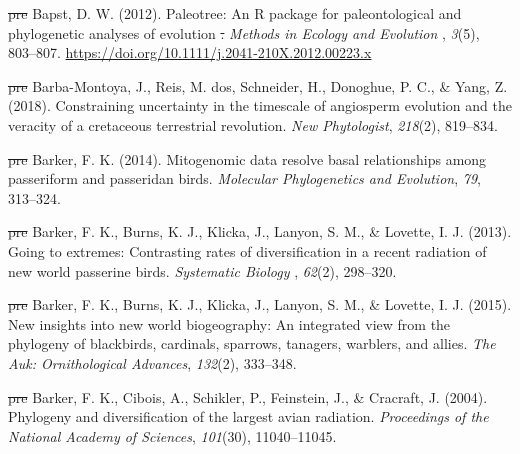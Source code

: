 \documentclass[english,man]{apa6} %
\providecommand{\DIFaddtex}[1]{{\protect\color{blue}\uwave{#1}}} %
\providecommand{\DIFdeltex}[1]{{\protect\color{red}\sout{#1}}}                      %
\providecommand{\DIFaddbegin}{} %
\providecommand{\DIFaddend}{} %
\providecommand{\DIFdelbegin}{} %
\providecommand{\DIFdelend}{} %
\providecommand{\DIFadd}[1]{\texorpdfstring{\DIFaddtex{#1}}{#1}} %
\providecommand{\DIFdel}[1]{\texorpdfstring{\DIFdeltex{#1}}{}} %
\newcommand{\DIFscaledelfig}{0.5}
\newlength{\DIFdelgraphicswidth} %
\newlength{\DIFdelgraphicsheight} %
\newcommand{\DIFaddincludegraphics}[2][]{{\color{blue}\fbox{\DIFOincludegraphics[#1]{#2}}}} %
\newcommand{\DIFdelincludegraphics}[2][]{%
\sbox{\DIFdelgraphicsbox}{\DIFOincludegraphics[#1]{#2}}%
\settoboxwidth{\DIFdelgraphicswidth}{\DIFdelgraphicsbox} %
\settoboxtotalheight{\DIFdelgraphicsheight}{\DIFdelgraphicsbox} %
\scalebox{\DIFscaledelfig}{%
\parbox[b]{\DIFdelgraphicswidth}{\usebox{\DIFdelgraphicsbox}\\[-\baselineskip] \rule{\DIFdelgraphicswidth}{0em}}\llap{\resizebox{\DIFdelgraphicswidth}{\DIFdelgraphicsheight}{%
\setlength{\unitlength}{\DIFdelgraphicswidth}%
\begin{picture}(1,1)%
\thicklines\linethickness{2pt} %
{\color[rgb]{1,0,0}\put(0,0){\framebox(1,1){}}}%
{\color[rgb]{1,0,0}\put(0,0){\line( 1,1){1}}}%
{\color[rgb]{1,0,0}\put(0,1){\line(1,-1){1}}}%
\end{picture}%
}\hspace*{3pt}}} %
} %
\DeclareRobustCommand{\DIFaddbegin}{\DIFOaddbegin \let\includegraphics\DIFaddincludegraphics} %
\DeclareRobustCommand{\DIFaddend}{\DIFOaddend \let\includegraphics\DIFOincludegraphics} %
\DeclareRobustCommand{\DIFdelbegin}{\DIFOdelbegin \let\includegraphics\DIFdelincludegraphics} %
\DeclareRobustCommand{\DIFdelend}{\DIFOaddend \let\includegraphics\DIFOincludegraphics} %
\begin{document}
\leavevmode\DIFdelbegin %
\DIFdel{pre}%
\DIFdelend \hypertarget{ref-Bapst2012a}{}\DIFdelbegin %
\DIFdelend %
Bapst, D. W. (2012). \DIFdelbegin %
\DIFdelend Paleotree: An R package for paleontological and phylogenetic analyses of evolution\DIFdelbegin %
\DIFdel{. }\DIFdelend \DIFaddbegin \DIFadd{. }\DIFaddend \emph{\DIFdelbegin %
\DIFdelend Methods in Ecology and Evolution\DIFdelbegin %
\DIFdelend }, \emph{3}(5), 803--807. \url{https://doi.org/10.1111/j.2041-210X.2012.00223.x}

\leavevmode\DIFdelbegin %
\DIFdel{pre}%
\DIFdelend \hypertarget{ref-barba2018constraining}{}\DIFdelbegin %
\DIFdelend %
Barba-Montoya, J., Reis, M. dos, Schneider, H., Donoghue, P. C., \& Yang, Z. (2018). Constraining uncertainty in the timescale of angiosperm evolution and the veracity of a cretaceous terrestrial revolution. \emph{New Phytologist}, \emph{218}(2), 819--834.

\leavevmode\DIFdelbegin %
\DIFdel{pre}%
\DIFdelend \hypertarget{ref-barker2014mitogenomic}{}\DIFdelbegin %
\DIFdelend %
Barker, F. K. (2014). Mitogenomic data resolve basal relationships among passeriform and passeridan birds. \emph{Molecular Phylogenetics and Evolution}, \emph{79}, 313--324.

\leavevmode\DIFdelbegin %
\DIFdel{pre}%
\DIFdelend \hypertarget{ref-barker2013going}{}\DIFdelbegin %
\DIFdelend %
Barker, F. K., Burns, K. J., Klicka, J., Lanyon, S. M., \& Lovette, I. J. (2013). Going to extremes: Contrasting rates of diversification in a recent radiation of new world passerine birds. \emph{\DIFdelbegin %
\DIFdelend Systematic Biology\DIFdelbegin %
\DIFdelend }, \emph{62}(2), 298--320.

\leavevmode\DIFdelbegin %
\DIFdel{pre}%
\DIFdelend \hypertarget{ref-barker2015new}{}\DIFdelbegin %
\DIFdelend %
Barker, F. K., Burns, K. J., Klicka, J., Lanyon, S. M., \& Lovette, I. J. (2015). New insights into new world biogeography: An integrated view from the phylogeny of blackbirds, cardinals, sparrows, tanagers, warblers, and allies. \emph{The Auk: Ornithological Advances}, \emph{132}(2), 333--348.

\leavevmode\DIFdelbegin %
\DIFdel{pre}%
\DIFdelend \hypertarget{ref-barker2004phylogeny}{}\DIFdelbegin %
\DIFdelend %
Barker, F. K., Cibois, A., Schikler, P., Feinstein, J., \& Cracraft, J. (2004). Phylogeny and diversification of the largest avian radiation. \emph{Proceedings of the National Academy of Sciences}, \emph{101}(30), 11040--11045.
\end{document}
